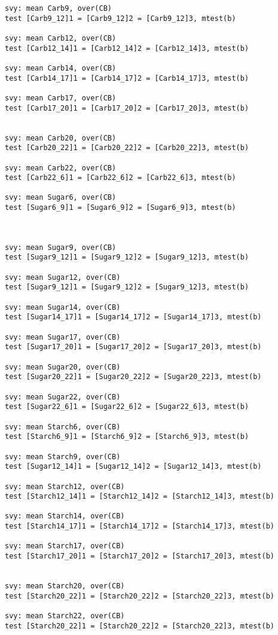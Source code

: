 \documentclass[]{article}
\begin{document}
\begin{verbatim}
svy: mean Carb9, over(CB)
test [Carb9_12]1 = [Carb9_12]2 = [Carb9_12]3, mtest(b) 

svy: mean Carb12, over(CB)
test [Carb12_14]1 = [Carb12_14]2 = [Carb12_14]3, mtest(b) 

svy: mean Carb14, over(CB)
test [Carb14_17]1 = [Carb14_17]2 = [Carb14_17]3, mtest(b) 

svy: mean Carb17, over(CB)
test [Carb17_20]1 = [Carb17_20]2 = [Carb17_20]3, mtest(b) 


svy: mean Carb20, over(CB)
test [Carb20_22]1 = [Carb20_22]2 = [Carb20_22]3, mtest(b) 

svy: mean Carb22, over(CB)
test [Carb22_6]1 = [Carb22_6]2 = [Carb22_6]3, mtest(b) 

svy: mean Sugar6, over(CB)
test [Sugar6_9]1 = [Sugar6_9]2 = [Sugar6_9]3, mtest(b) 



svy: mean Sugar9, over(CB)
test [Sugar9_12]1 = [Sugar9_12]2 = [Sugar9_12]3, mtest(b) 

svy: mean Sugar12, over(CB)
test [Sugar9_12]1 = [Sugar9_12]2 = [Sugar9_12]3, mtest(b) 

svy: mean Sugar14, over(CB)
test [Sugar14_17]1 = [Sugar14_17]2 = [Sugar14_17]3, mtest(b) 

svy: mean Sugar17, over(CB)
test [Sugar17_20]1 = [Sugar17_20]2 = [Sugar17_20]3, mtest(b) 

svy: mean Sugar20, over(CB)
test [Sugar20_22]1 = [Sugar20_22]2 = [Sugar20_22]3, mtest(b) 

svy: mean Sugar22, over(CB)
test [Sugar22_6]1 = [Sugar22_6]2 = [Sugar22_6]3, mtest(b) 

svy: mean Starch6, over(CB)
test [Starch6_9]1 = [Starch6_9]2 = [Starch6_9]3, mtest(b) 

svy: mean Starch9, over(CB)
test [Sugar12_14]1 = [Sugar12_14]2 = [Sugar12_14]3, mtest(b) 

svy: mean Starch12, over(CB)
test [Starch12_14]1 = [Starch12_14]2 = [Starch12_14]3, mtest(b) 

svy: mean Starch14, over(CB)
test [Starch14_17]1 = [Starch14_17]2 = [Starch14_17]3, mtest(b) 

svy: mean Starch17, over(CB)
test [Starch17_20]1 = [Starch17_20]2 = [Starch17_20]3, mtest(b) 


svy: mean Starch20, over(CB)
test [Starch20_22]1 = [Starch20_22]2 = [Starch20_22]3, mtest(b) 

svy: mean Starch22, over(CB)
test [Starch20_22]1 = [Starch20_22]2 = [Starch20_22]3, mtest(b) 


\end{verbatim}
\end{document}
